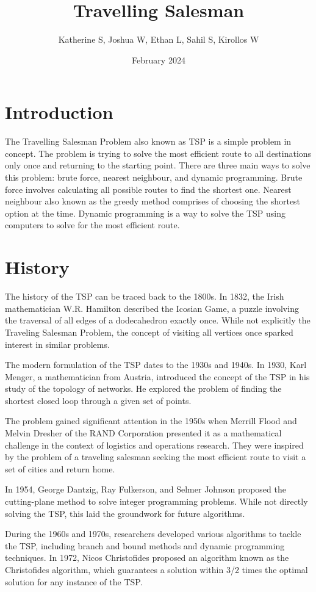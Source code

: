 \documentclass{article}
\title{Travelling Salesman}
\author{Katherine S, Joshua W, Ethan L, Sahil S, Kirollos W}
\date{February 2024}
\begin{document}
\maketitle

\section{Introduction}
The Travelling Salesman Problem also known as TSP is a simple problem in concept. The problem is trying to solve the most efficient route to all destinations only once and returning to the starting point. There are three main ways to solve this problem: brute force, nearest neighbour, and dynamic programming. Brute force involves calculating all possible routes to find the shortest one. Nearest neighbour also known as the greedy method comprises of choosing the shortest option at the time. Dynamic programming is a way to solve the TSP using computers to solve for the most efficient route.

\section{History} %
 The history of the TSP can be traced back to the 1800s. In 1832, the Irish mathematician W.R. Hamilton described the Icosian Game, a puzzle involving the traversal of all edges of a dodecahedron exactly once. While not explicitly the Traveling Salesman Problem, the concept of visiting all vertices once sparked interest in similar problems.

The modern formulation of the TSP dates to the 1930s and 1940s. In 1930, Karl Menger, a mathematician from Austria, introduced the concept of the TSP in his study of the topology of networks. He explored the problem of finding the shortest closed loop through a given set of points.

The problem gained significant attention in the 1950s when Merrill Flood and Melvin Dresher of the RAND Corporation presented it as a mathematical challenge in the context of logistics and operations research. They were inspired by the problem of a traveling salesman seeking the most efficient route to visit a set of cities and return home.

In 1954, George Dantzig, Ray Fulkerson, and Selmer Johnson proposed the cutting-plane method to solve integer programming problems. While not directly solving the TSP, this laid the groundwork for future algorithms.

During the 1960s and 1970s, researchers developed various algorithms to tackle the TSP, including branch and bound methods and dynamic programming techniques. In 1972, Nicos Christofides proposed an algorithm known as the Christofides algorithm, which guarantees a solution within 3/2 times the optimal solution for any instance of the TSP.
\end{document}
